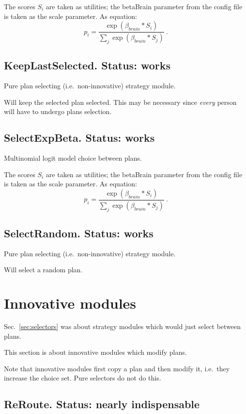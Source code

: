 The scores $S_i$ are taken as utilities; the betaBrain parameter from the  config file is taken as the scale parameter. As equation:
\[
p_i = \frac{\exp( \beta_{brain} * S_i)}{\sum_j \exp( \beta_{brain} * S_j )} \ .
\]

\subsection{KeepLastSelected. Status: works}

Pure plan selecting (i.e.\ non-innovative) strategy module.

Will keep the selected plan selected.  This may be necessary since \emph{every} person will have to undergo plans selection.

\subsection{SelectExpBeta. Status: works}

Multinomial logit model choice between plans.

The scores $S_i$ are taken as utilities; the betaBrain parameter from the  config file is taken as the scale parameter. As equation:
\[
p_i = \frac{\exp( \beta_{brain} * S_i)}{\sum_j \exp( \beta_{brain} * S_j )} \ .
\]

\subsection{SelectRandom.  Status: works}

Pure plan selecting (i.e.\ non-innovative) strategy module.

Will select a random plan.

\vfill\eject
\section{Innovative modules}

Sec.~\ref{sec:selectors} was about strategy modules which would just select between plans.

This section is about innovative modules which modify plans.

Note that innovative modules first copy a plan and then modify it, i.e.\ they increase the choice set.  Pure selectors do not do this.

\subsection{ReRoute.  Status: nearly indispensable}

